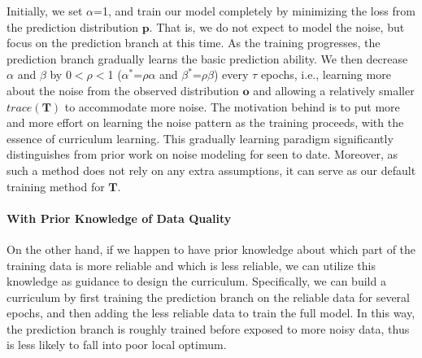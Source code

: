 Initially, we set $\alpha$=1, and train our model  completely by minimizing the loss from the prediction distribution $\mathbf{p}$. That is, we do not expect to model the noise,  but focus  on the prediction branch at this time. As the training progresses, the prediction branch gradually learns the basic prediction ability. We then decrease $\alpha$ and  $\beta$ by 0$<$$\rho$$<$1 ($\alpha^*$=$\rho$$\alpha$ and $\beta^*$=$\rho$$\beta$) every $\tau$ epochs, i.e., learning more about the noise from the observed distribution $\mathbf{o}$ and allowing a relatively smaller $trace(\mathbf{T})$ to accommodate more noise.
The motivation behind is to put more and more effort on learning the noise pattern as the training proceeds, 
with the essence of curriculum learning.
This gradually learning paradigm significantly distinguishes from prior work on noise modeling for \DS seen to date. 
Moreover, as such a method does not rely on any extra assumptions,
it can serve as our default training method for $\mathbf{T}$.

\paragraph{With Prior Knowledge of Data Quality}
On the other hand, if we happen to have prior knowledge about which part of the training data is more reliable and which is less reliable, we can utilize this knowledge as guidance to design the curriculum.  
Specifically, we can build a curriculum by first training the prediction branch on the reliable data for several epochs, and then adding the less reliable data to train the full model. In this way, the prediction branch is roughly trained before exposed to more noisy data, thus is less likely to fall into poor local optimum.

